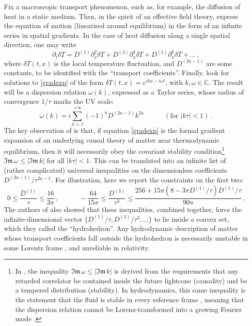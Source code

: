 \documentclass[a4paper, amsfonts, amssymb, amsmath, reprint, showkeys, nofootinbib, twoside,notitlepage,onecolumn]{revtex4-2}
\newcommand{\spc}{\quad \quad \quad}
\theoremstyle{definition}
\theoremstyle{theorem}
\theoremstyle{corollary}
\begin{document}
Fix a macroscopic transport phenomenon, such as, for example, the diffusion of heat in a static medium. Then, in the spirit of an effective field theory, express the equation of motion (linearised around equilibrium) in the form of an infinite series in spatial gradients. In the case of heat diffusion along a single spatial direction, one may write
\begin{equation}\label{gradexp}
\partial_t  \delta T=D^{(1)}\partial_x^2 \delta T+D^{(3)}\partial_x^4 \delta T+D^{(5)}\partial_x^6 \delta T+... \, ,
\end{equation}
where $\delta T(t,x)$ is the local temperature fluctuation, and $D^{(2a-1)}$ are some constants, to be identified with the ``transport coefficients''. Finally, look for solutions to \eqref{gradexp} of the form $\delta T(t,x)=e^{ikx-i\omega t}$, with $k,\omega\in \mathbb{C}$. The result will be a dispersion relation $\omega(k)$, expressed as a Taylor series, whose radius of convergence $1/\tau$ marks the UV scale:
\begin{equation}\label{theseries}
\omega(k)=i\sum_{a=1}^{+\infty} (-1)^a D^{(2a-1)} k^{2a} \spc (\text{for }|k\tau|<1) \, .
\end{equation}
The key observation of \cite{HellerBounds2023,HellerHydroHedron2023jtd} is that, if equation \eqref{gradexp} is the formal gradient expansion of an underlying causal theory of matter near thermodynamic equilibrium, then it will necessarily obey the covariant stability condition\footnote{In \cite{HellerBounds2023}, the inequality $\mathfrak{Im}\,\omega\leq |\mathfrak{Im} \, k|$ is derived from the requirements that any retarded correlator be contained inside the future lightcone (causality) and be a tempered distribution (stability). In hydrodynamics, this same inequality is the statement that the fluid is stable in every reference frame \cite{GavassinoBounds2023,GavassinoDispersion2024}, meaning that the dispersion relation cannot be Lorenz-transformed into a growing Fourier mode \cite{Hiscock_Insatibility_first_order}.} $\mathfrak{Im}\,\omega\leq |\mathfrak{Im} \, k|$ for all $|k\tau|<1$. 
This can be translated into an infinite list of (rather complicated) universal inequalities on the dimensionless coefficients $D^{(2a-1)}/\tau^{2a-1}$. For illustration, here we report the constraints on the first two:
\begin{equation}\label{firsttwocondiHydroedron}
0 \leq \dfrac{D^{(1)}}{\tau} \leq \dfrac{16}{3\pi} \, , \spc -\dfrac{64}{15\pi} \leq \dfrac{D^{(3)}}{\tau^3} \leq \dfrac{256 +15\pi (8{-}3\pi D^{(1)}/\tau)D^{(1)}/\tau}{90\pi } \, .
\end{equation}
The authors of \cite{HellerHydroHedron2023jtd} also showed that these inequalities, combined together, force the infinite-dimensional vector $\{D^{(1)}/\tau,D^{(3)}/\tau^3,... \}$ to lie inside a convex set, which they called the ``hydrohedron''. Any hydrodynamic description of matter whose transport coefficients fall outside the hydrohedron is necessarily unstable in some Lorentz frame \cite{GavassinoBounds2023}, and unreliable in relativity.
\end{document}
